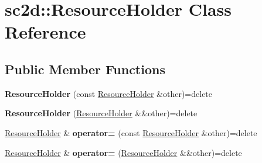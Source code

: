 \hypertarget{classsc2d_1_1ResourceHolder}{}\section{sc2d\+:\+:Resource\+Holder Class Reference}
\label{classsc2d_1_1ResourceHolder}
\subsection*{Public Member Functions}
\begin{DoxyCompactItemize}
\item 
\mbox{\label{classsc2d_1_1ResourceHolder_ab8c7cdbde6ce7381c9948ed647ef60d2}} 
{\bfseries Resource\+Holder} (const \hyperlink{classsc2d_1_1ResourceHolder}{Resource\+Holder} \&other)=delete
\item 
\mbox{\label{classsc2d_1_1ResourceHolder_a5c48b0ad19439188dd068e72822370ac}} 
{\bfseries Resource\+Holder} (\hyperlink{classsc2d_1_1ResourceHolder}{Resource\+Holder} \&\&other)=delete
\item 
\mbox{\label{classsc2d_1_1ResourceHolder_af334a2d9cc92db91173df1df44331caa}} 
\hyperlink{classsc2d_1_1ResourceHolder}{Resource\+Holder} \& {\bfseries operator=} (const \hyperlink{classsc2d_1_1ResourceHolder}{Resource\+Holder} \&other)=delete
\item 
\mbox{\label{classsc2d_1_1ResourceHolder_a28e7f3db026b0316d6d5b4af6cf2edf3}} 
\hyperlink{classsc2d_1_1ResourceHolder}{Resource\+Holder} \& {\bfseries operator=} (\hyperlink{classsc2d_1_1ResourceHolder}{Resource\+Holder} \&\&other)=delete
\end{DoxyCompactItemize}
